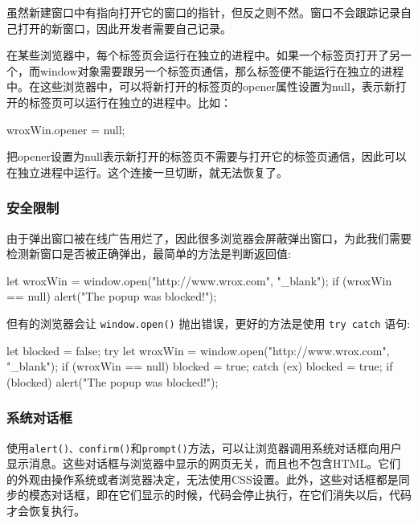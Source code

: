 虽然新建窗口中有指向打开它的窗口的指针，但反之则不然。窗口不会跟踪记录自己打开的新窗口，因此开发者需要自己记录。

在某些浏览器中，每个标签页会运行在独立的进程中。如果一个标签页打开了另一个，而window对象需要跟另一个标签页通信，那么标签便不能运行在独立的进程中。在这些浏览器中，可以将新打开的标签页的opener属性设置为null，表示新打开的标签页可以运行在独立的进程中。比如：

\begin{JavaScript}
wroxWin.opener = null; 
\end{JavaScript}

把opener设置为null表示新打开的标签页不需要与打开它的标签页通信，因此可以在独立进程中运行。这个连接一旦切断，就无法恢复了。

\subsubsection*{安全限制}

由于弹出窗口被在线广告用烂了，因此很多浏览器会屏蔽弹出窗口，为此我们需要检测新窗口是否被正确弹出，最简单的方法是判断返回值:

\begin{JavaScript}
let wroxWin = window.open("http://www.wrox.com", "_blank"); 
if (wroxWin == null){    
    alert("The popup was blocked!"); 
} 
\end{JavaScript}

但有的浏览器会让 \texttt{window.open()} 抛出错误，更好的方法是使用 \texttt{try catch} 语句:

\begin{JavaScript}
let blocked = false; try {
    let wroxWin = window.open("http://www.wrox.com", "_blank");
    if (wroxWin == null) { 
        blocked = true;
    }
} catch (ex) {
    blocked = true;
} if (blocked) {
    alert("The popup was blocked!");
} 
\end{JavaScript}

\subsubsection*{系统对话框}

使用\texttt{alert()、confirm()}和\texttt{prompt()}方法，可以让浏览器调用系统对话框向用户显示消息。这些对话框与浏览器中显示的网页无关，而且也不包含HTML。它们的外观由操作系统或者浏览器决定，无法使用CSS设置。此外，这些对话框都是同步的模态对话框，即在它们显示的时候，代码会停止执行，在它们消失以后，代码才会恢复执行。

